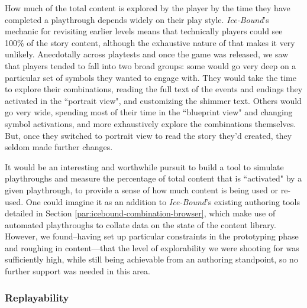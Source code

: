 How much of the total content is explored by the player by the time they have completed a playthrough depends widely on their play style. \textit{Ice-Bound}'s mechanic for revisiting earlier levels means that technically players could see 100\% of the story content, although the exhaustive nature of that makes it very unlikely. Anecdotally across playtests and once the game was released, we saw that players tended to fall into two broad groups: some would go very deep on a particular set of symbols they wanted to engage with. They would take the time to explore their combinations, reading the full text of the events and endings they activated in the ``portrait view", and customizing the shimmer text. Others would go very wide, spending most of their time in the ``blueprint view" and changing symbol activations, and more exhaustively explore the combinations themselves. But, once they switched to portrait view to read the story they'd created, they seldom made further changes.

It would be an interesting and worthwhile pursuit to build a tool to simulate playthroughs and measure the percentage of total content that is ``activated" by a given playthrough, to provide a sense of how much content is being used or re-used. One could imagine it as an addition to \textit{Ice-Bound}'s existing authoring tools detailed in Section \ref{par:icebound-combination-browser}, which make use of automated playthroughs to collate data on the state of the content library. However, we found--having set up particular constraints in the prototyping phase and roughing in content---that the level of explorability we were shooting for was sufficiently high, while still being achievable from an authoring standpoint, so no further support was needed in this area.

\subsubsection{Replayability}\label{subsubsec:icebound-replayability}

